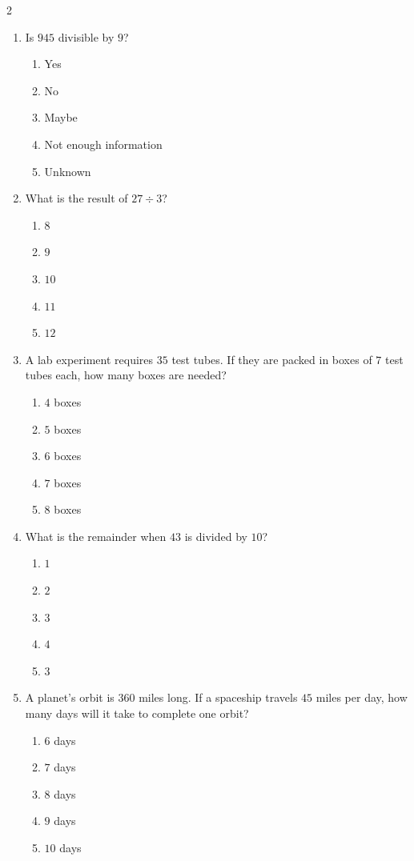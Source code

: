 \documentclass[10pt]{article}
\begin{document}
\begin{multicols}{2}
\begin{enumerate}[label=\textbf{Q\arabic*.}, leftmargin=*, itemsep=6pt, parsep=0pt]
  \item \small Is $945$ divisible by $9$?
  \begin{enumerate}[label=(\Alph*), leftmargin=0.6cm, nosep, itemsep=2pt]
    \item Yes
    \item No
    \item Maybe
    \item Not enough information
    \item Unknown
  \end{enumerate}

  \item \small What is the result of $27 \div 3$?
  \begin{enumerate}[label=(\Alph*), leftmargin=0.6cm, nosep, itemsep=2pt]
    \item $8$
    \item $9$
    \item $10$
    \item $11$
    \item $12$
  \end{enumerate}

  \item \small A lab experiment requires $35$ test tubes. If they are packed in boxes of $7$ test tubes each, how many boxes are needed?
  \begin{enumerate}[label=(\Alph*), leftmargin=0.6cm, nosep, itemsep=2pt]
    \item $4$ boxes
    \item $5$ boxes
    \item $6$ boxes
    \item $7$ boxes
    \item $8$ boxes
  \end{enumerate}

  \item \small What is the remainder when $43$ is divided by $10$?
  \begin{enumerate}[label=(\Alph*), leftmargin=0.6cm, nosep, itemsep=2pt]
    \item $1$
    \item $2$
    \item $3$
    \item $4$
    \item $3$
  \end{enumerate}

  \item \small A planet's orbit is $360$ miles long. If a spaceship travels $45$ miles per day, how many days will it take to complete one orbit?
  \begin{enumerate}[label=(\Alph*), leftmargin=0.6cm, nosep, itemsep=2pt]
    \item $6$ days
    \item $7$ days
    \item $8$ days
    \item $9$ days
    \item $10$ days
  \end{enumerate}

\end{enumerate}
\end{multicols}
\end{document}
